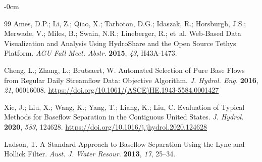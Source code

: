 \documentclass[hydrology,article,submit,pdftex,moreauthors]{Definitions/mdpi}
\begin{document}
\begin{adjustwidth}{-\extralength}{0cm}
\begin{thebibliography}{99}
Ames, D.P.; Li, Z.; Qiao, X.; Tarboton, D.G.; Idaszak, R.; Horsburgh, J.S.; Merwade, V.; Miles, B.; Swain, N.R.; Lineberger, R.; et~al. Web-Based Data Visualization and Analysis Using HydroShare and the Open Source Tethys Platform. \textit{AGU Fall Meet. Abstr.} \textbf{2015}, \textit{43}, H43A-1473.

Cheng, L.; Zhang, L.; Brutsaert, W. Automated Selection of Pure Base Flows from Regular Daily Streamflow Data: Objective Algorithm. \textit{J. Hydrol. Eng.} \textbf{2016}, \textit{21}, 06016008. \url{https://doi.org/10.1061/(ASCE)HE.1943-5584.0001427}

Xie, J.; Liu, X.; Wang, K.; Yang, T.; Liang, K.; Liu, C. Evaluation of Typical Methods for Baseflow Separation in the Contiguous United States. \textit{J. Hydrol.} \textbf{2020}, \textit{583}, 124628. \url{https://doi.org/10.1016/j.jhydrol.2020.124628}

Ladson, T. A Standard Approach to Baseflow Separation Using the Lyne and Hollick Filter. \textit{Aust. J. Water Resour.} \textbf{2013}, \textit{17}, 25--34.

\end{thebibliography}

\end{adjustwidth}
\end{document}
